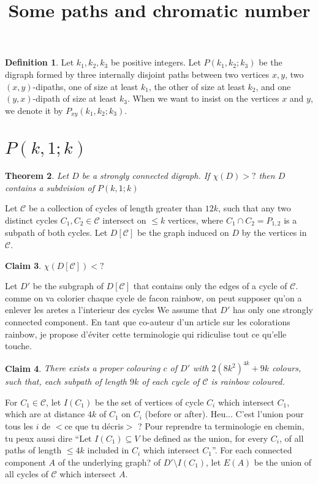 \documentclass[utf8,10pt]{article}
\title{Some paths and chromatic number}
\theoremstyle{plain}
\newtheorem{theorem}{Theorem}
\newtheorem{claim}[theorem]{Claim}
\theoremstyle{definition}
\newtheorem{definition}[theorem]{Definition}
\theoremstyle{remark}
\newcommand{\william}[1]{{\color{red}{\bf William:} #1}}
\newcommand{\nathann}[1]{{\color{blue}{\bf Nathann:} #1}}
\begin{document}
\maketitle

\begin{definition}
Let $k_1,k_2,k_3$ be positive integers. Let $P(k_1,k_2;k_3)$ be the digraph formed by three internally disjoint paths between two vertices $x,y$, two $(x,y)$-dipaths, one of size at least $k_1$, the other of size at least $k_2$, and one $(y,x)$-dipath of size at least $k_3$.
When we want to insist on the vertices $x$ and $y$, we denote it by $P_{xy}(k_1,k_2;k_3)$.
\end{definition}




\section{$P(k,1;k)$}

\begin{theorem}
Let $D$ be a strongly connected digraph. If $\chi(D) > ?$ then $D$ contains a subdvision of $P(k,1;k)$
\end{theorem}

Let $\mathcal{C}$ be a collection of cycles of length greater than $12k$, such
that any two distinct cycles $C_1,C_2\in\mathcal C$ intersect on $\leq k$
vertices, where $C_1\cap C_2=P_{1,2}$ is a subpath of both cycles.  Let $D[\mathcal{C}]$ be
the graph induced on $D$ by the vertices in $\mathcal{C}$.

\begin{claim}\label{DC}
$\chi(D[\mathcal{C}]) < ? $
\end{claim}

Let $D'$ be the subgraph of $D[\mathcal{C}]$ that contains only the edges of a cycle of  $\mathcal{C}$.
\william{comme on va colorier chaque cycle de facon rainbow, on peut supposer qu'on a enlever les aretes a l'interieur des cycles}
We assume that $D'$ has only one strongly connected component.
\nathann{En tant que co-auteur d'un article sur les colorations rainbow, je propose d'éviter cette terminologie qui ridiculise tout ce qu'elle touche.}


\begin{claim}
There exists a proper colouring $c$ of $D'$ with $2(8k^2)^{4k} + 9k$ colours, such that, each subpath of length $9k$ of each cycle of $\mathcal{C}$ is rainbow coloured.
\end{claim}

For $C_1\in \mathcal{C}$, let $I(C_1)$ be the set of vertices of cycle $C_i$ which intersect $C_1$, which are at distance $4k$
of $C_1$ on $C_i$ (before or after).
\nathann{Heu... C'est l'union pour tous les $i$ de $<$ce que tu décris$>$ ? Pour reprendre ta terminologie en chemin, tu peux aussi dire ``Let $I(C_1)\subseteq V$ be defined as the union, for every $C_i$, of all paths of length $\leq 4k$ included in $C_i$ which intersect $C_1$''.}
For each connected component $A$ \nathann{of the underlying graph?}
of $D'\setminus I(C_1)$, let $E(A)$ be the union of all cycles of $\mathcal{C}$ which intersect $A$.
\end{document}
